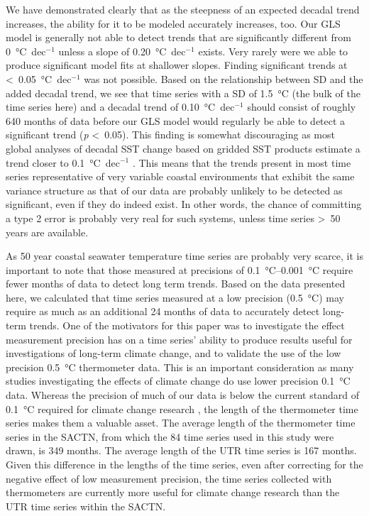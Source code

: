 \documentclass[]{ametsoc}
\begin{document}
We have demonstrated clearly that as the steepness of an expected decadal trend increases, the ability for it to be modeled accurately increases, too. Our GLS model is generally not able to detect trends that are significantly different from \SI{0}{\degreeCelsius}~dec$^{-1}$ unless a slope of \SI{0.20}{\degreeCelsius}~dec$^{-1}$ exists. Very rarely were we able to produce significant model fits at shallower slopes. Finding significant trends at \textless~\SI{0.05}{\degreeCelsius}~dec$^{-1}$ was not possible. Based on the relationship between SD and the added decadal trend, we see that time series with a SD of \SI{1.5}{\degreeCelsius} (the bulk of the time series here) and a decadal trend of \SI{0.10}{\degreeCelsius}~dec$^{-1}$ should consist of roughly 640 months of data before our GLS model would regularly be able to detect a significant trend (\emph{p} \textless~0.05). This finding is somewhat discouraging as most global analyses of decadal SST change based on gridded SST products estimate a trend closer to \SI{0.1}{\degreeCelsius}~dec$^{-1}$ \citep[\emph{e.g.}][]{IPCC2013}. This means that the trends present in most time series representative of very variable coastal environments that exhibit the same variance structure as that of our data are probably unlikely to be detected as significant, even if they do indeed exist. In other words, the chance of committing a type 2 error is probably very real for such systems, unless time series \textgreater~50 years are available.

As 50 year coastal seawater temperature time series are probably very scarce, it is important to note that those measured at precisions of \SIrange{0.1}{0.001}{\degreeCelsius} require fewer months of data to detect long term trends. Based on the data presented here, we calculated that time series measured at a low precision (\SI{0.5}{\degreeCelsius}) may require as much as an additional 24 months of data to accurately detect long-term trends. One of the motivators for this paper was to investigate the effect measurement precision has on a time series' ability to produce results useful for investigations of long-term climate change, and to validate the use of the low precision \SI{0.5}{\degreeCelsius} thermometer data. This is an important consideration as many studies investigating the effects of climate change \citep[\emph{e.g.}][]{Grant2010, Scherrer2010, Lathlean2012} do use lower precision \SI{0.1}{\degreeCelsius} data. Whereas the precision of much of our data is below the current standard of \SI{0.1}{\degreeCelsius} required for climate change research \citep{Ohring2005,Jarraud2008}, the length of the thermometer time series makes them a valuable asset. The average length of the thermometer time series in the SACTN, from which the 84 time series used in this study were drawn, is 349 months. The average length of the UTR time series is 167 months. Given this difference in the lengths of the time series, even after correcting for the negative effect of low measurement precision, the time series collected with thermometers are currently more useful for climate change research than the UTR time series within the SACTN.
\end{document}
